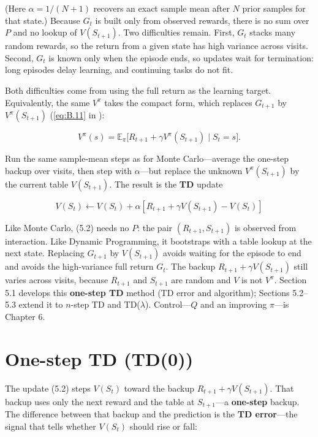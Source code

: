 (Here $\alpha=1/(N{+}1)$ recovers an exact sample mean after $N$ prior samples for that state.) Because $G_t$ is built only from observed rewards, there is no sum over $P$ and no lookup of $V(S_{t+1})$. Two difficulties remain. First, $G_t$ stacks many random rewards, so the return from a given state has high variance across visits. Second, $G_t$ is known only when the episode ends, so updates wait for termination: long episodes delay learning, and continuing tasks do not fit.

Both difficulties come from using the full return as the learning target. Equivalently, the same $V^\pi$ takes the compact form, which replaces $G_{t+1}$ by $V^\pi(S_{t+1})$ (\eqref{eq:B.11} in ):

\begin{equation}
V^\pi(s)
=
\mathbb{E}_\pi\bigl[R_{t+1}+\gamma V^\pi(S_{t+1})\mid S_t=s\bigr].
\tag{5.1}
\end{equation}

Run the same sample-mean steps as for Monte Carlo---average the one-step backup over visits, then step with $\alpha$---but replace the unknown $V^\pi(S_{t+1})$ by the current table $V(S_{t+1})$. The result is the \textbf{TD} update

\begin{equation}
V(S_t) \leftarrow V(S_t) + \alpha \left[ R_{t+1} + \gamma V(S_{t+1}) - V(S_t) \right]
\tag{5.2}
\end{equation}

Like Monte Carlo, (5.2) needs no $P$: the pair $(R_{t+1},S_{t+1})$ is observed from interaction. Like Dynamic Programming, it bootstraps with a table lookup at the next state. Replacing $G_{t+1}$ by $V(S_{t+1})$ avoids waiting for the episode to end and avoids the high-variance full return $G_t$. The backup $R_{t+1}+\gamma V(S_{t+1})$ still varies across visits, because $R_{t+1}$ and $S_{t+1}$ are random and $V$ is not $V^\pi$. Section 5.1 develops this \textbf{one-step TD} method (TD error and algorithm); Sections 5.2--5.3 extend it to $n$-step TD and TD($\lambda$). Control---$Q$ and an improving $\pi$---is Chapter 6.

\section{One-step TD (TD(0))}

The update (5.2) steps $V(S_t)$ toward the backup $R_{t+1}+\gamma V(S_{t+1})$. That backup uses only the next reward and the table at $S_{t+1}$---a \textbf{one-step} backup. The difference between that backup and the prediction is the \textbf{TD error}---the signal that tells whether $V(S_t)$ should rise or fall:

